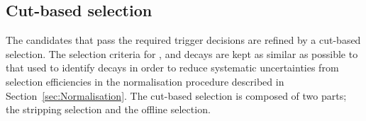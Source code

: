 


\subsection{Cut-based selection}
\label{sec:cutbasedsel}
The \bmumu candidates that pass the required trigger decisions are refined by a cut-based selection. %
The selection criteria for \bhh, \bujpsik and \bsjpsiphi decays are kept as similar as possible to that used to identify \bmumu decays in order to reduce systematic uncertainties from selection efficiencies in the normalisation procedure described in Section~\ref{sec:Normalisation}. 
The cut-based selection is composed of two parts; the stripping selection and the offline selection. 

